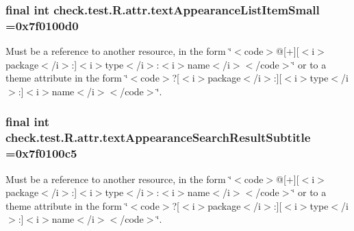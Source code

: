 \subsubsection[{text\+Appearance\+List\+Item\+Small}]{\setlength{\rightskip}{0pt plus 5cm}final int check.\+test.\+R.\+attr.\+text\+Appearance\+List\+Item\+Small =0x7f0100d0\hspace{0.3cm}{\ttfamily [static]}}\label{classcheck_1_1test_1_1_r_1_1attr_a207e3b80940457620df45d83ed20ab6d}
Must be a reference to another resource, in the form \char`\"{}$<$code$>$@\mbox{[}+\mbox{]}\mbox{[}$<$i$>$package$<$/i$>$\+:\mbox{]}$<$i$>$type$<$/i$>$\+:$<$i$>$name$<$/i$>$$<$/code$>$\char`\"{} or to a theme attribute in the form \char`\"{}$<$code$>$?\mbox{[}$<$i$>$package$<$/i$>$\+:\mbox{]}\mbox{[}$<$i$>$type$<$/i$>$\+:\mbox{]}$<$i$>$name$<$/i$>$$<$/code$>$\char`\"{}. \hypertarget{classcheck_1_1test_1_1_r_1_1attr_add36b7b3af37d5ad8320ceb443d2dd2f}{}
\subsubsection[{text\+Appearance\+Search\+Result\+Subtitle}]{\setlength{\rightskip}{0pt plus 5cm}final int check.\+test.\+R.\+attr.\+text\+Appearance\+Search\+Result\+Subtitle =0x7f0100c5\hspace{0.3cm}{\ttfamily [static]}}\label{classcheck_1_1test_1_1_r_1_1attr_add36b7b3af37d5ad8320ceb443d2dd2f}
Must be a reference to another resource, in the form \char`\"{}$<$code$>$@\mbox{[}+\mbox{]}\mbox{[}$<$i$>$package$<$/i$>$\+:\mbox{]}$<$i$>$type$<$/i$>$\+:$<$i$>$name$<$/i$>$$<$/code$>$\char`\"{} or to a theme attribute in the form \char`\"{}$<$code$>$?\mbox{[}$<$i$>$package$<$/i$>$\+:\mbox{]}\mbox{[}$<$i$>$type$<$/i$>$\+:\mbox{]}$<$i$>$name$<$/i$>$$<$/code$>$\char`\"{}. \hypertarget{classcheck_1_1test_1_1_r_1_1attr_a13a9931a99a930b514fe408c215c4cd6}{}
